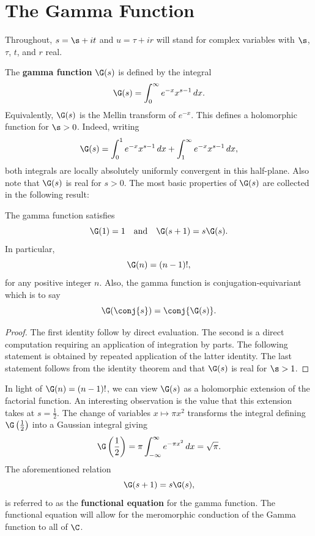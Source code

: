 \chapter{The Gamma Function}\label{ch:the_gamma_function}
  Throughout, \(s = \s+it\) and \(u = \tau+ir\) will stand for complex variables with \(\s\), \(\tau\), \(t\), and \(r\) real.
  
  The \textbf{gamma function} \(\G(s)\) is defined by the integral
  \[
    \G(s) = \int_{0}^{\infty}e^{-x}x^{s-1}\,dx.
  \]
  Equivalently, \(\G(s)\) is the Mellin transform of \(e^{-x}\). This defines a holomorphic function for \(\s > 0\). Indeed, writing
  \[
    \G(s) = \int_{0}^{1}e^{-x}x^{s-1}\,dx+\int_{1}^{\infty}e^{-x}x^{s-1}\,dx,
  \]
  both integrals are locally absolutely uniformly convergent in this half-plane. Also note that \(\G(s)\) is real for \(s > 0\). The most basic properties of \(\G(s)\) are collected in the following result:

  \begin{proposition}\label{prop:Factorial_properties_of_gamma_function}
    The gamma function satisfies
    \[
        \G(1) = 1 \quad \text{and} \quad \G(s+1) = s\G(s).
    \]
    In particular,
    \[
      \G(n) = (n-1)!,
    \]
    for any positive integer \(n\). Also, the gamma function is conjugation-equivariant which is to say
    \[
      \G(\conj{s}) = \conj{\G(s)}.
    \]
  \end{proposition}
  \begin{proof}
    The first identity follow by direct evaluation. The second is a direct computation requiring an application of integration by parts. The following statement is obtained by repeated application of the latter identity. The last statement follows from the identity theorem and that \(\G(s)\) is real for \(\s > 1\).
  \end{proof}

  In light of \(\G(n) = (n-1)!\), we can view \(\G(s)\) as a holomorphic extension of the factorial function. An interesting observation is the value that this extension takes at \(s = \frac{1}{2}\). The change of variables \(x \mapsto \pi x^{2}\) transforms the integral defining \(\G\left(\frac{1}{2}\right)\) into a Gaussian integral giving
  \begin{equation}\label{equ:gamma_function_at_1/2}
    \G\left(\frac{1}{2}\right) = \pi\int_{-\infty}^{\infty}e^{-\pi x^{2}}\,dx = \sqrt{\pi}.
  \end{equation}
  The aforementioned relation
  \[
    \G(s+1) = s\G(s),
  \]
  is referred to as the \textbf{functional equation} for the gamma function. The functional equation will allow for the meromorphic conduction of the Gamma function to all of \(\C\).

